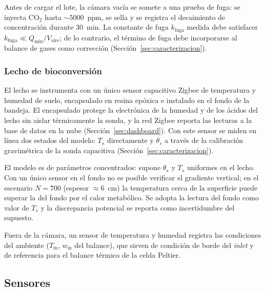 \begin{remark}\label{rem:fugas}
Antes de cargar el lote, la cámara vacía se somete a una prueba de fuga: se
inyecta CO$_2$ hasta $\sim 5000$~ppm, se sella y se registra el decaimiento de
concentración durante $30$~min. La constante de fuga $k_{\mathrm{fuga}}$
medida debe satisfacer $k_{\mathrm{fuga}} \ll Q_{\min}/V_{\mathrm{aire}}$; de
lo contrario, el término de fuga debe incorporarse al balance de gases como
corrección (Sección~\ref{sec:caracterizacion}).
\end{remark}

\subsubsection{Lecho de bioconversión}

El lecho se instrumenta con un único sensor capacitivo Zigbee de temperatura
y humedad de suelo, encapsulado en resina epóxica e instalado en el fondo de
la bandeja. El encapsulado protege la electrónica de la humedad y de los
ácidos del lecho sin aislar térmicamente la sonda, y la red Zigbee reporta
las lecturas a la base de datos en la nube (Sección~\ref{sec:dashboard}).
Con este sensor se miden en línea dos estados del modelo: $T_s$ directamente
y $\theta_s$ a través de la calibración gravimétrica de la sonda capacitiva
(Sección~\ref{sec:caracterizacion}).

\begin{remark}\label{rem:lecho-profundo}
El modelo es de parámetros concentrados: supone $\theta_s$ y $T_s$ uniformes
en el lecho. Con un único sensor en el fondo no es posible verificar el
gradiente vertical; en el escenario $N = 700$ (espesor $\approx 6$~cm) la
temperatura cerca de la superficie puede superar la del fondo por el calor
metabólico. Se adopta la lectura del fondo como valor de $T_s$ y la
discrepancia potencial se reporta como incertidumbre del supuesto.
\end{remark}

Fuera de la cámara, un sensor de temperatura y humedad registra las
condiciones del ambiente ($T_{\mathrm{in}}$, $w_{\mathrm{in}}$ del balance),
que sirven de condición de borde del \emph{inlet} y de referencia para el
balance térmico de la celda Peltier.

\subsection{Sensores}\label{sec:sensores}

